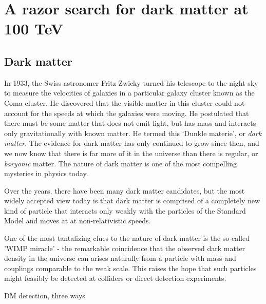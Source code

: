 \chapter{A razor search for dark matter at 100 TeV}\label{ch:DM_100_TeV}

\section{Dark matter}
In 1933, the Swiss astronomer Fritz Zwicky turned his telescope to the night sky to measure the velocities of galaxies in a particular galaxy cluster known as the Coma cluster. He discovered that the visible matter in this cluster could not account for the speeds at which the galaxies were moving. He postulated that there must be some matter that does not emit light, but has mass and interacts only gravitationally with known matter. He termed this `Dunkle materie', or \emph{dark matter}. The evidence for dark matter has only continued to grow since then, and we now know that there is far more of it in the universe than there is regular, or \emph{baryonic} matter. The nature of dark matter is one of the most compelling mysteries in physics today.


Over the years, there have been many dark matter candidates, but the most widely accepted view today is that dark matter is comprised of a completely new kind of particle that interacts only weakly with the particles of the Standard Model and moves at at non-relativistic speeds.

One of the most tantalizing clues to the nature of dark matter is the so-called 'WIMP miracle' - the remarkable coincidence that the observed dark matter density in the universe can arises naturally from a particle with mass and couplings comparable to the weak scale. This raises the hope that such particles might feasibly be detected at colliders or direct detection experiments.
\begin{marginfigure}
  \centering
  \caption{DM detection, three ways}
  \label{fig:dm_annihilation}
\end{marginfigure}

